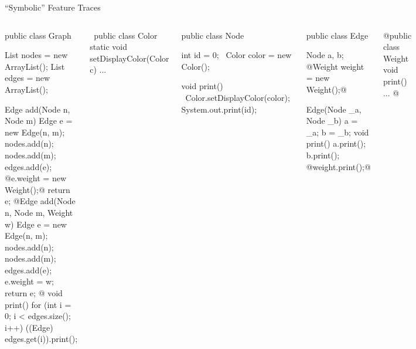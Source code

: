 \begin{frame}[fragile]{``Symbolic'' Feature Traces}
	\begin{tiny}
		\begin{columns}
\begin{codetight}{}
public class Graph {
	List nodes = new ArrayList();
	List edges = new ArrayList();

	Edge add(Node n, Node m) {
		Edge e = new Edge(n, m);
		nodes.add(n); nodes.add(m); edges.add(e);
		@e.weight = new Weight();@
		return e;
	}
	@Edge add(Node n, Node m, Weight w) {
		Edge e = new Edge(n, m);
		nodes.add(n); nodes.add(m); edges.add(e);
		e.weight = w;
		return e;
	}@
	void print() {
		for (int i = 0; i < edges.size(); i++) {
			((Edge) edges.get(i)).print();
		}
	}
}
\end{codetight}
\begin{codetight}{}
~public class Color {
	static void setDisplayColor(Color c) {...}
}~
\end{codetight}	
\begin{codetight}{}
public class Node {
	int id = 0;
	~Color color = new Color();~

	void print() {
		~Color.setDisplayColor(color);~
		System.out.print(id);
	}
}
\end{codetight}
\begin{codetight}{}
public class Edge {
	Node a, b;
	@Weight weight = new Weight();@

	Edge(Node _a, Node _b) {
		a = _a; b = _b;
	}
	void print() {
		a.print(); b.print();
		@weight.print();@
	}
}
\end{codetight}
\begin{codetight}{}
@public class Weight {
	void print() {...}
}@
\end{codetight}
		\end{columns}
	\end{tiny}
\end{frame}

